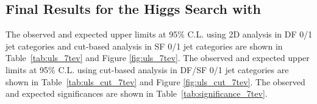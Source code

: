 \clearpage
\subsection{Final Results for the Higgs Search with \intlumiSevenTeV{}}
\label{sec:search_results_7tev}

The observed and expected upper limits at 95\% C.L. using 2D analysis in DF 0/1 jet categories 
and cut-based analysis in SF 0/1 jet categories 
are shown in Table~\ref{tab:uls_7tev} and Figure \ref{fig:uls_7tev}.
The observed and expected upper limits at 95\% C.L. using cut-based analysis in DF/SF 0/1 jet categories 
are shown in Table~\ref{tab:uls_cut_7tev} and Figure \ref{fig:uls_cut_7tev}.
The observed and expected significances are shown in Table~\ref{tab:significance_7tev}. 


